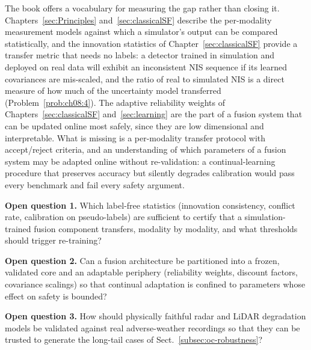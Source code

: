 The book offers a vocabulary for measuring the gap rather than closing it. Chapters~\ref{sec:Principles} and~\ref{sec:classicalSF} describe the per-modality measurement models against which a simulator's output can be compared statistically, and the innovation statistics of Chapter~\ref{sec:classicalSF} provide a transfer metric that needs no labels: a detector trained in simulation and deployed on real data will exhibit an inconsistent NIS sequence if its learned covariances are mis-scaled, and the ratio of real to simulated NIS is a direct measure of how much of the uncertainty model transferred (Problem~\ref{prob:ch08:4}). The adaptive reliability weights of Chapters~\ref{sec:classicalSF} and~\ref{sec:learning} are the part of a fusion system that can be updated online most safely, since they are low dimensional and interpretable. What is missing is a per-modality transfer protocol with accept/reject criteria, and an understanding of which parameters of a fusion system may be adapted online without re-validation: a continual-learning procedure that preserves accuracy but silently degrades calibration would pass every benchmark and fail every safety argument.

\begin{list4a}
    \item \textbf{Open question 1.} Which label-free statistics (innovation consistency, conflict rate, calibration on pseudo-labels) are sufficient to certify that a simulation-trained fusion component transfers, modality by modality, and what thresholds should trigger re-training?
    \item \textbf{Open question 2.} Can a fusion architecture be partitioned into a frozen, validated core and an adaptable periphery (reliability weights, discount factors, covariance scalings) so that continual adaptation is confined to parameters whose effect on safety is bounded?
    \item \textbf{Open question 3.} How should physically faithful radar and LiDAR degradation models be validated against real adverse-weather recordings so that they can be trusted to generate the long-tail cases of Sect.~\ref{subsec:oc-robustness}?
\end{list4a}

